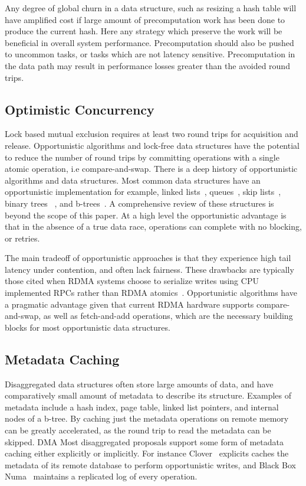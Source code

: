 Any degree of global churn in a data structure, such as resizing a hash table
will have amplified cost if large amount of precomputation work has been done to
produce the current hash. Here any strategy which preserve the work will be
beneficial in overall system performance. Precomputation should also be pushed
to uncommon tasks, or tasks which are not latency sensitive.  Precomputation in
the data path may result in performance losses greater than the avoided round
trips.

\subsection{Optimistic Concurrency} 

Lock based mutual exclusion requires at least two round trips for acquisition
and release. Opportunistic algorithms and lock-free data structures have the
potential to reduce the number of round trips by committing operations with a
single atomic operation, i.e compare-and-swap. There is a deep history of
opportunistic algorithms and data structures. Most common data structures have
an opportunistic implementation for example, linked
lists~\cite{linked-list-cas}, queues~\cite{simple-fast}, skip
lists~\cite{lock-free-skip}, binary trees ~\cite{non-block-binary}, and
b-trees~\cite{read-concur-btree,lock-free-btree}. A comprehensive review of
these structures is beyond the scope of this paper. At a high level the
opportunistic advantage is that in the absence of a true data race, operations
can complete with no blocking, or retries.

The main tradeoff of opportunistic approaches is that they experience high tail
latency under contention, and often lack fairness. These drawbacks are typically
those cited when RDMA systems choose to serialize writes using CPU implemented
RPCs rather than RDMA atomics~\cite{pilaf, cell, herd}. Opportunistic algorithms
have a pragmatic advantage given that current RDMA hardware supports
compare-and-swap, as well as fetch-and-add operations, which are the necessary
building blocks for most opportunistic data structures.

\subsection{Metadata Caching}
Disaggregated data structures often store large amounts of data, and have
comparatively small amount of metadata to describe its structure. Examples of
metadata include a hash index, page table, linked list pointers, and internal
nodes of a b-tree. By caching just the metadata operations on remote memory can
be greatly accelerated, as the round trip to read the metadata can be skipped.
DMA 
Most disaggregated proposals support some form of metadata caching either
explicitly or implicitly. For instance Clover~\cite{clover} explicits caches the
metadata of its remote database to perform opportunistic writes, and Black Box
Numa~\cite{black-box-numa} maintains a replicated log of every operation. 

